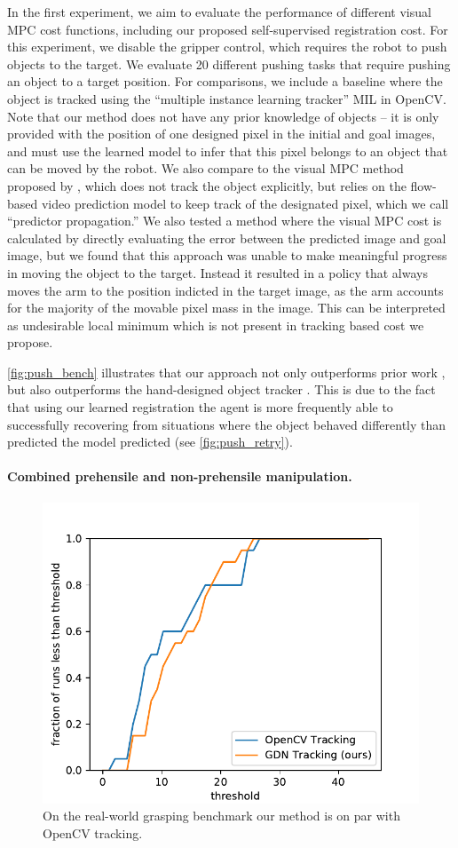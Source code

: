 In the first experiment, we aim to evaluate the performance of different visual MPC cost functions, including our proposed self-supervised registration cost. For this experiment, we disable the gripper control, which requires the robot to push objects to the target. We evaluate 20 different pushing tasks that require pushing an object to a target position. For comparisons, we include a baseline where the object is tracked using the ``multiple instance learning tracker'' MIL \cite{babenko2009visual} in OpenCV. Note that our method does not have any prior knowledge of objects -- it is only provided with the position of one designed pixel in the initial and goal images, and must use the learned model to infer that this pixel belongs to an object that can be moved by the robot. We also compare to the visual MPC method proposed by \citet{sna},
which does not track the object explicitly, but relies on the flow-based video prediction model to keep track of the designated pixel, which we call ``predictor propagation.'' We also tested a method where the visual MPC cost is calculated by directly evaluating the error between the predicted image and goal image, but we found that this approach was unable to make meaningful progress in moving the object to the target. Instead it resulted in a policy that always moves the arm to the position indicted in the target image, as the arm accounts for the majority of the movable pixel mass in the image. This can be interpreted as undesirable local minimum which is not present in tracking based cost we propose.

\autoref{fig:push_bench} illustrates that our approach not only outperforms prior work \cite{sna}, but also outperforms the hand-designed object tracker \cite{babenko2009visual}. This is due to the fact that using our learned registration the agent is more frequently able to successfully recovering from situations where the object behaved differently than predicted the model predicted (see \autoref{fig:push_retry}).

\vspace{-0.1in}
\paragraph{Combined prehensile and non-prehensile manipulation.}

\begin{figure}
\vspace{-0.3in}
\centering
\includegraphics[width=0.35\columnwidth]{images/grasping_score_cdf.pdf}
\caption{\small{On the real-world grasping benchmark our method is on par with OpenCV tracking.}}
\label{fig:grasp_bench}
\vspace{-0.3in}
\end{figure}


